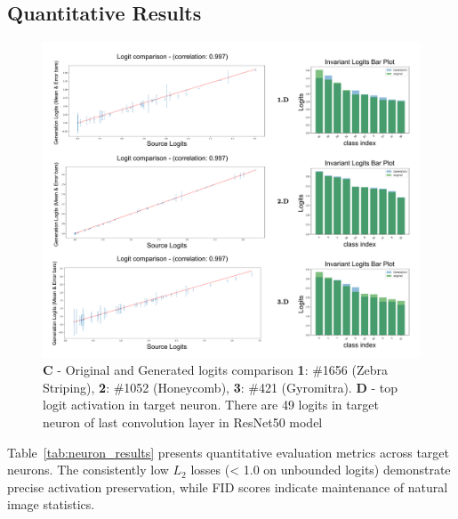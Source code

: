 \subsection{Quantitative Results}

\begin{figure}[h]
\centering
\includegraphics[width=\linewidth]{figures/main/sae_results_2.pdf}
\caption{ \textbf{C} - Original and Generated logits comparison  \textbf{1}: \#1656 (Zebra Striping), \textbf{2}: \#1052 (Honeycomb), \textbf{3}: \#421 (Gyromitra). \textbf{D} - top logit activation in target neuron. There are 49 logits in target neuron of last convolution layer in ResNet50 model}
\label{fig:experiment_1_1}
\end{figure}

Table~\ref{tab:neuron_results} presents quantitative evaluation metrics across target neurons. The consistently low $L_2$ losses (< 1.0 on unbounded logits) demonstrate precise activation preservation, while FID scores indicate maintenance of natural image statistics.


